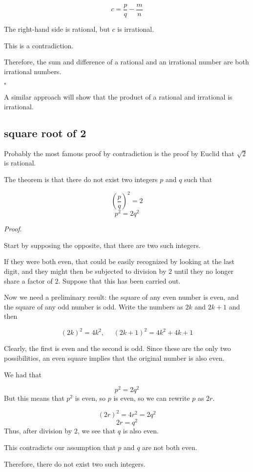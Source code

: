 \documentclass[11pt, oneside]{article}
\begin{document}
\[ c = \frac{p}{q} - \frac{m}{n} \]

The right-hand side is rational, but $c$ is irrational.  

This is a contradiction.

Therefore, the sum and difference of a rational and an irrational number are both irrational numbers.

$\square$

A similar approach will show that the product of a rational and irrational is irrational. 

\subsection*{square root of 2}

\label{sec:sqrt_two}

Probably the most famous proof by contradiction is the proof by Euclid that $\sqrt{2}$ is rational.

The theorem is that there do not exist two integers $p$ and $q$ such that 

\[ (\frac{p}{q})^2 = 2 \]
\[ p^2 = 2q^2 \]

\emph{Proof}.

Start by supposing the opposite, that there are two such integers.  

If they were both even, that could be easily recognized by looking at the last digit, and they might then be subjected to division by $2$ until they no longer share a factor of $2$.  Suppose that this has been carried out.

Now we need a preliminary result:  the square of any even number is even, and the square of any odd number is odd.   Write the numbers as $2k$ and $2k + 1$ and then

\[ (2k)^2 = 4k^2, \ \ \ \ \ \ (2k + 1)^2 = 4k^2 + 4k + 1 \]

Clearly, the first is even and the second is odd.  Since these are the only two possibilities, an even square implies that the original number is also even.

We had that

\[ p^2 = 2q^2 \]
But this means that $p^2$ is even, so $p$ is even, so we can rewrite $p$ as $2r$.

\[ (2r)^2 = 4r^2 = 2q^2 \]
\[ 2r = q^2 \]
Thus, after division by $2$, we see that $q$ is also even.

This contradicts our assumption that $p$ and $q$ are not both even.

Therefore, there do not exist two such integers.
\end{document}
